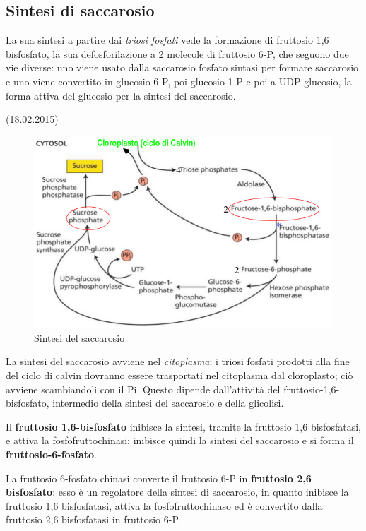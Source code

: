 \documentclass[a4paper,12pt]{book}
\begin{document}
\subsection{Sintesi di saccarosio}

La sua sintesi a partire dai \emph{triosi fosfati} vede la formazione di fruttosio 1,6 bisfosfato, la sua defosforilazione a 2 molecole di fruttosio 6-P, che seguono due vie diverse: uno viene usato dalla saccarosio fosfato sintasi per formare saccarosio e uno viene convertito in glucosio 6-P, poi glucosio 1-P e poi a UDP-glucosio, la forma attiva del glucosio per la sintesi del saccarosio.

(18.02.2015)
\begin{figure}[H]
\centering
\includegraphics[scale=0.4]{immagini/saccarosio1.jpg}
\caption{Sintesi del saccarosio}
\end{figure}

La sintesi del saccarosio avviene nel \emph{citoplasma}: i triosi fosfati prodotti alla fine del ciclo di calvin dovranno essere trasportati nel citoplasma dal cloroplasto; ciò avviene scambiandoli con il Pi. Questo dipende dall'attività del fruttosio-1,6-bisfosfato, intermedio della sintesi del saccarosio e della glicolisi.

Il \textbf{fruttosio 1,6-bisfosfato} inibisce la sintesi, tramite la fruttosio 1,6 bisfosfatasi, e attiva la fosfofruttochinasi: inibisce quindi la sintesi del saccarosio e si forma il \textbf{fruttosio-6-fosfato}.

La fruttosio 6-fosfato chinasi converte il fruttosio 6-P in \textbf{fruttosio 2,6 bisfosfato}: esso è un regolatore della sintesi di saccarosio, in quanto inibisce la fruttosio 1,6 bisfosfatasi, attiva la fosfofruttochinaso ed è convertito dalla fruttosio 2,6 bisfosfatasi in fruttosio 6-P.
\end{document}
